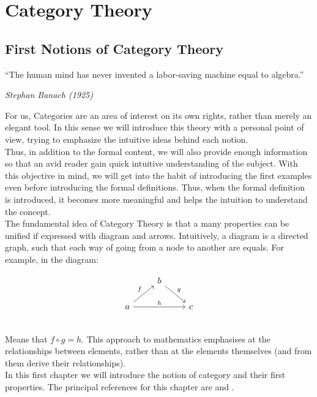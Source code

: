 \part{Category Theory}
\label{Part1}



\chapter{First Notions of Category Theory}

\epigraph{“The human mind has never invented a labor-saving machine equal to algebra.” }{\textit{Stephan Banach (1925)}}

For us, Categories are an area of interest on its own rights, rather than merely an elegant tool. In this sense we will introduce this theory with a personal point of view, trying to emphasize the intuitive ideas behind each notion.\\

Thus, in addition to the formal content, we will also provide enough information so that an avid reader gain quick intuitive understanding of the subject. With this objective in mind, we will get into the habit of introducing the first examples even before introducing the formal definitions. Thus, when the formal definition is introduced, it becomes more meaningful and helps the intuition to understand the concept.\\

The fundamental idea of Category Theory is that a many properties can be unified if expressed with diagram and arrows. Intuitively, a diagram is a directed graph, such that each way of going from a node to another are equals. For example, in the diagram:

\[
  \begin{tikzcd}
    & b \arrow[rd, "g"]& \\
    a\arrow[ru, "f"] \arrow[rr, "h"] && c\\
  \end{tikzcd}
\]
Means that $f\circ g = h$. This approach to mathematics emphasises  at the relationships between elements, rather than at the elements themselves (and from them derive their relationships).\\

In this first chapter we will introduce the notion of category and their first properties. The principal references for this chapter are \cite{mac2013categories} and \cite{riehl2017category}. 

